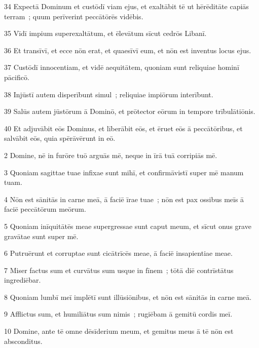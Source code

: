 \psalmVerse
  {\phantom{0}34}
  {Expectā Dominum et custōdī viam ejus, et exaltābit tē ut hērēditāte capiās terram~; quum perīverint peccātōrēs vidēbis.}


\psalmVerse
  {\phantom{0}35}
  {Vīdī impium superexaltātum, et ēlevātum sīcut cedrōs Libanī.}


\psalmVerse
  {\phantom{0}36}
  {Et transīvī, et ecce nōn erat, et quaesīvī eum, et nōn est inventus locus ejus.}


\psalmVerse
  {\phantom{0}37}
  {Custōdī innocentiam, et vidē aequitātem, quoniam sunt reliquiae hominī pācificō.}


\psalmVerse
  {\phantom{0}38}
  {Injūstī autem disperībunt simul~; reliquiae impiōrum interībunt.}


\psalmVerse
  {\phantom{0}39}
  {Salūs autem jūstōrum ā Dominō, et prōtector eōrum in tempore trībulātiōnis.}


\psalmVerse
  {\phantom{0}40}
  {Et adjuvābit eōs Dominus, et līberābit eōs, et ēruet eōs ā peccātōribus, et salvābit eōs, quia spērāvērunt in eō.}




\psalmVerse
  {\phantom{00}2}
  {Domine, nē in furōre tuō arguās mē, neque in īrā tuā corripiās mē.}


\psalmVerse
  {\phantom{00}3}
  {Quoniam sagittae tuae infixae sunt mihī, et confirmāvistī super mē manum tuam.}


\psalmVerse
  {\phantom{00}4}
  {Nōn est sānitās in carne meā, ā faciē īrae tuae~; nōn est pax ossibus meīs ā faciē peccātōrum meōrum.}


\psalmVerse
  {\phantom{00}5}
  {Quoniam inīquitātēs meae supergressae sunt caput meum, et sīcut onus grave gravātae sunt super mē.}


\psalmVerse
  {\phantom{00}6}
  {Putruērunt et corruptae sunt cicātrīcēs meae, ā faciē insapientiae meae.}


\psalmVerse
  {\phantom{00}7}
  {Miser factus sum et curvātus sum usque in fīnem~; tōtā diē contrīstātus ingrediēbar.}


\psalmVerse
  {\phantom{00}8}
  {Quoniam lumbī meī implētī sunt illūsiōnibus, et nōn est sānitās in carne meā.}


\psalmVerse
  {\phantom{00}9}
  {Afflictus sum, et humiliātus sum nimis~; rugiēbam ā gemitū cordis meī.}


\psalmVerse
  {\phantom{0}10}
  {Domine, ante tē omne dēsīderium meum, et gemitus meus ā tē nōn est absconditus.}


